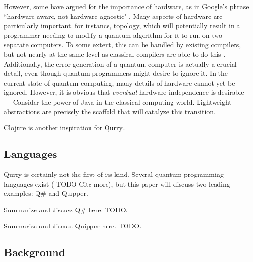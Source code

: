 \documentclass[a4paper,twocolumn,11pt,accepted=2017-05-09]{quantumarticle}
\begin{document}
However, some have argued for the importance of hardware, as in Google's phrase ``hardware aware, not hardware agnostic" \cite{google_cloud}.
Many aspects of hardware are particularly important, for instance, topology, which will potentially result in a programmer needing to modify a quantum algorithm for it to run on two separate computers.
To some extent, this can be handled by existing compilers, but not nearly at the same level as classical compilers are able to do this \cite{quilc}.
Additionally, the error generation of a quantum computer is actually a crucial detail, even though quantum programmers might desire to ignore it.
In the current state of quantum computing, many details of hardware cannot yet be ignored. 
However, it is obvious that \emph{eventual} hardware independence is desirable --- Consider the power of Java in the classical computing world. Lightweight abstractions are precisely the scaffold that will catalyze this transition.

Clojure is another inspiration for Qurry..
\cite{hickey2008clojure}

\subsection{Languages}

Qurry is certainly not the first of its kind.
Several quantum programming languages exist (\cite{larose2019overview, omer1998procedural} TODO Cite more), but this paper will discuss two leading examples: Q\# and Quipper.

Summarize and discuss Q\# here. TODO.

\cite{svore2018q}

Summarize and discuss Quipper here. TODO.

\cite{selinger2006lambda}
\cite{selinger2004towards}

\cite{quipper}
\cite{quipper_guide}
\cite{proto_quipper}

\subsection{Background}
\end{document}
